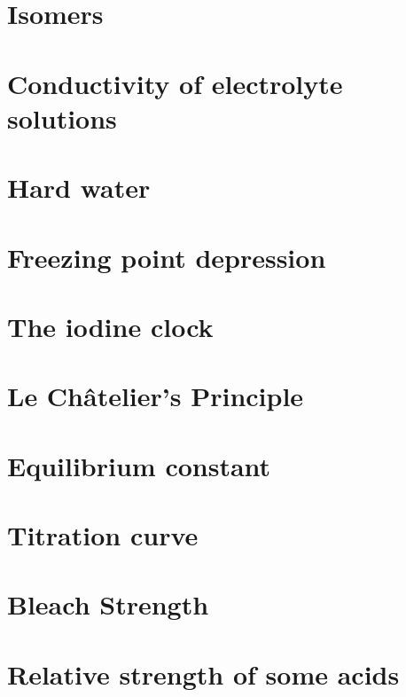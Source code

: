 \documentclass{book}
\begin{document}
%
%
%
%
\newpage\section{Isomers }
\newpage  \section{Conductivity of electrolyte solutions }
\newpage  \section{Hard water }
\newpage  \section{Freezing point depression }
\newpage  \section{The iodine clock }
\newpage  \section{Le Ch\^atelier's Principle}
\newpage  \section{Equilibrium constant}
\newpage  \section{Titration curve}

\newpage  \section{Bleach Strength}
\newpage\section{Relative strength of some acids}
\end{document}
